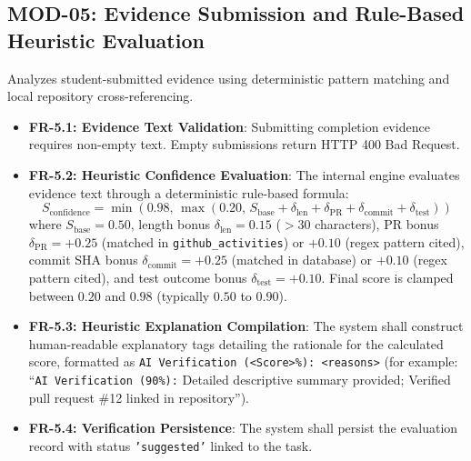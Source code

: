 \documentclass{scrreprt}
\begin{document}
\subsection{MOD-05: Evidence Submission and Rule-Based Heuristic Evaluation}
Analyzes student-submitted evidence using deterministic pattern matching and local repository cross-referencing.
\begin{itemize}
    \item \textbf{FR-5.1: Evidence Text Validation}: Submitting completion evidence requires non-empty text. Empty submissions return HTTP 400 Bad Request.
    \item \textbf{FR-5.2: Heuristic Confidence Evaluation}: The internal engine evaluates evidence text through a deterministic rule-based formula:
    \begin{equation}
        S_{\text{confidence}} = \min\left(0.98, \, \max\left(0.20, \, S_{\text{base}} + \delta_{\text{len}} + \delta_{\text{PR}} + \delta_{\text{commit}} + \delta_{\text{test}}\right)\right)
    \end{equation}
    where $S_{\text{base}} = 0.50$, length bonus $\delta_{\text{len}} = 0.15$ ($>30$ characters), PR bonus $\delta_{\text{PR}} = +0.25$ (matched in \texttt{github\_activities}) or $+0.10$ (regex pattern cited), commit SHA bonus $\delta_{\text{commit}} = +0.25$ (matched in database) or $+0.10$ (regex pattern cited), and test outcome bonus $\delta_{\text{test}} = +0.10$. Final score is clamped between $0.20$ and $0.98$ (typically $0.50$ to $0.90$).
    \item \textbf{FR-5.3: Heuristic Explanation Compilation}: The system shall construct human-readable explanatory tags detailing the rationale for the calculated score, formatted as \texttt{AI Verification (<Score>\%): <reasons>} (for example: ``\texttt{AI Verification (90\%):} Detailed descriptive summary provided; Verified pull request \#12 linked in repository'').
    \item \textbf{FR-5.4: Verification Persistence}: The system shall persist the evaluation record with status \texttt{'suggested'} linked to the task.
\end{itemize}
\end{document}

